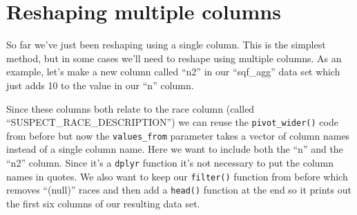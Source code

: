 \documentclass[
]{krantz}
\makeatletter
\newenvironment{Shaded}{\begin{snugshade}}{\end{snugshade}}
\newcommand{\DecValTok}[1]{\textcolor[rgb]{0.06,0.06,0.06}{#1}}
\newcommand{\NormalTok}[1]{#1}
\newcommand{\OtherTok}[1]{\textcolor[rgb]{0.37,0.37,0.37}{#1}}
\newcommand{\SpecialCharTok}[1]{\textcolor[rgb]{0,0,0}{#1}}
\newenvironment{kframe}{%
\medskip{}
\setlength{\fboxsep}{.8em}
 \def\at@end@of@kframe{}%
 \ifinner\ifhmode%
  \def\at@end@of@kframe{\end{minipage}}%
  \begin{minipage}{\columnwidth}%
 \fi\fi%
 \def\FrameCommand##1{\hskip\@totalleftmargin \hskip-\fboxsep
 \colorbox{shadecolor}{##1}\hskip-\fboxsep
     \hskip-\linewidth \hskip-\@totalleftmargin \hskip\columnwidth}%
 \MakeFramed {\advance\hsize-\width
   \@totalleftmargin\z@ \linewidth\hsize
   \@setminipage}}%
 {\par\unskip\endMakeFramed%
 \at@end@of@kframe}
\renewenvironment{Shaded}{\begin{kframe}}{\end{kframe}}
\makeatother
\begin{document}
\hypertarget{reshaping-multiple-columns}{%
\section{Reshaping multiple columns}\label{reshaping-multiple-columns}}

So far we've just been reshaping using a single column. This is the simplest method, but in some cases we'll need to reshape using multiple columns. As an example, let's make a new column called ``n2'' in our ``sqf\_agg'' data set which just adds 10 to the value in our ``n'' column.

\begin{Shaded}
\end{Shaded}

Since these columns both relate to the race column (called ``SUSPECT\_RACE\_DESCRIPTION'') we can reuse the \texttt{pivot\_wider()} code from before but now the \texttt{values\_from} parameter takes a vector of column names instead of a single column name. Here we want to include both the ``n'' and the ``n2'' column. Since it's a \texttt{dplyr} function it's not necessary to put the column names in quotes. We also want to keep our \texttt{filter()} function from before which removes ``(null)'' races and then add a \texttt{head()} function at the end so it prints out the first six columns of our resulting data set.
\end{document}
